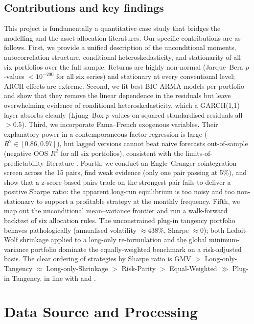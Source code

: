 \documentclass[11pt,a4paper]{article}
\begin{document}
\subsection{Contributions and key findings}
This project is fundamentally a quantitative case study that bridges the modelling and the asset-allocation literatures. Our specific contributions are as follows. First, we provide a unified description of the unconditional moments, autocorrelation structure, conditional heteroskedasticity, and stationarity of all six portfolios over the full sample. Returns are highly non-normal (Jarque--Bera $p$-values $<10^{-200}$ for all six series) and stationary at every conventional level; ARCH effects are extreme. Second, we fit best-BIC ARMA models per portfolio and show that they remove the linear dependence in the residuals but leave overwhelming evidence of conditional heteroskedasticity, which a GARCH(1,1) layer absorbs cleanly (Ljung--Box $p$-values on squared standardised residuals all $> 0.5$). Third, we incorporate Fama--French exogenous variables. Their explanatory power in a contemporaneous factor regression is large ($R^2 \in [0.86, 0.97]$), but lagged versions cannot beat naive forecasts out-of-sample (negative OOS $R^2$ for all six portfolios), consistent with the limits-of-predictability literature \citep{WelchGoyal2008}. Fourth, we conduct an Engle--Granger cointegration screen across the 15 pairs, find weak evidence (only one pair passing at 5\%), and show that a z-score-based pairs trade on the strongest pair fails to deliver a positive Sharpe ratio: the apparent long-run equilibrium is too noisy and too non-stationary to support a profitable strategy at the monthly frequency. Fifth, we map out the unconditional mean--variance frontier and run a walk-forward backtest of six allocation rules. The unconstrained plug-in tangency portfolio behaves pathologically (annualised volatility $\approx 438\%$, Sharpe $\approx 0$); both Ledoit--Wolf shrinkage applied to a long-only re-formulation and the global minimum-variance portfolio dominate the equally-weighted benchmark on a risk-adjusted basis. The clear ordering of strategies by Sharpe ratio is GMV $>$ Long-only-Tangency $\approx$ Long-only-Shrinkage $>$ Risk-Parity $>$ Equal-Weighted $\gg$ Plug-in Tangency, in line with \citet{DeMiguelGarlappiUppal2009} and \citet{JagannathanMa2003}.

\section{Data Source and Processing}
\end{document}

